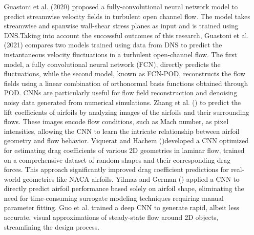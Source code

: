 Guastoni et al. (2020) proposed a fully-convolutional neural network model to predict streamwise velocity fields in turbulent open channel flow. The model takes streamwise and spanwise wall-shear stress planes as input and is trained using DNS.Taking into account the successful outcomes of this research, Guastoni et al. (2021) compares two models trained using data from DNS to predict the instantaneous velocity fluctuations in a turbulent open-channel flow. The first model, a fully convolutional neural network (FCN), directly predicts the fluctuations, while the second model, known as FCN-POD, reconstructs the flow fields using a linear combination of orthonormal basis functions obtained through POD. CNNs are particularly useful for flow field reconstruction and denoising noisy data generated from numerical simulations. Zhang et al. () to predict the lift coefficients of airfoils by analyzing images of the airfoils and their surrounding flows. These images encode flow conditions, such as Mach number, as pixel intensities, allowing the CNN to learn the intricate relationship between airfoil geometry and flow behavior. Viquerat and Hachem ()developed a CNN optimized for estimating drag coefficients of various 2D geometries in laminar flow, trained on a comprehensive dataset of random shapes and their corresponding drag forces. This approach significantly improved drag coefficient predictions for real-world geometries like NACA airfoils. Yilmaz and German () applied a CNN to directly predict airfoil performance based solely on airfoil shape, eliminating the need for time-consuming surrogate modeling techniques requiring manual parameter fitting. Guo et al. trained a deep CNN to generate rapid, albeit less accurate, visual approximations of steady-state flow around 2D objects, streamlining the design process.\\

